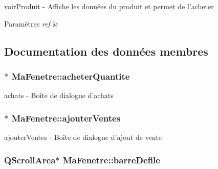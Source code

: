 voir\-Produit -\/ Affiche les données du produit et permet de l'acheter 


\begin{DoxyParams}{Paramètres}
{\em ref} & \\
\hline
\end{DoxyParams}


\subsection{Documentation des données membres}
\hypertarget{class_ma_fenetre_a8682e6343da2d0c2bfe1fab3ff0e7baa}{
\subsubsection[{acheter\-Quantite}]{$\ast$ Ma\-Fenetre\-::acheter\-Quantite\hspace{0.3cm}{\ttfamily [protected]}}}\label{class_ma_fenetre_a8682e6343da2d0c2bfe1fab3ff0e7baa}


achats -\/ Boîte de dialogue d'achats 

\hypertarget{class_ma_fenetre_a2332279c45b76ac1c9daf739c0bb3958}{
\subsubsection[{ajouter\-Ventes}]{$\ast$ Ma\-Fenetre\-::ajouter\-Ventes\hspace{0.3cm}{\ttfamily [protected]}}}\label{class_ma_fenetre_a2332279c45b76ac1c9daf739c0bb3958}


ajouter\-Ventes -\/ Boîte de dialogue d'ajout de vente 

\hypertarget{class_ma_fenetre_a4f199f65ae682c48c837875a486d2f3f}{
\subsubsection[{barre\-Defile}]{\setlength{\rightskip}{0pt plus 5cm}Q\-Scroll\-Area$\ast$ Ma\-Fenetre\-::barre\-Defile\hspace{0.3cm}{\ttfamily [protected]}}}\label{class_ma_fenetre_a4f199f65ae682c48c837875a486d2f3f}


